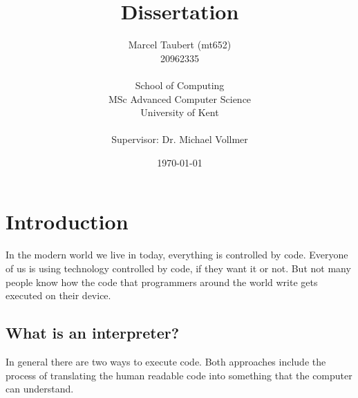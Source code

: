 \documentclass{article}
\title{Dissertation}
\author{
    Marcel Taubert  (mt652)\\
    20962335        \\
    \\
    School of Computing \\
    MSc Advanced Computer Science\\
    University of Kent \\
    \\
    Supervisor: Dr. Michael Vollmer
}
\date{\today}
\begin{document}
\maketitle
\clearpage

\section{Introduction}



In the modern world we live in today, everything is controlled by code.
Everyone of us is using technology controlled by code, if they want it or not.
But not many people know how the code that programmers around the world write
gets executed on their device.


\subsection{What is an interpreter?}
In general there are two ways to execute code. Both approaches include the
process of translating the human readable code into something that the computer
can understand. 
\end{document}
